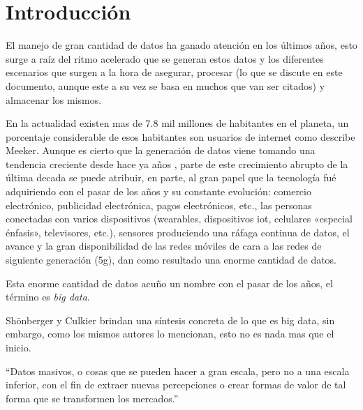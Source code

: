\section{Introducción} \label{sec:introduccion}
El manejo de gran cantidad de datos ha ganado atención en los últimos
años\cite{newvantage2019},
esto surge a raíz del ritmo acelerado que se generan estos datos y los 
diferentes escenarios que surgen a la hora de asegurar\cites{rawat2019,
kantarcioglu2019}, procesar (lo que se discute en este documento, aunque este a
su vez se basa en muchos que van ser citados) y almacenar\cites{padgavankar2014, agrawal2016, hongming2017}
los mismos.


En la actualidad existen mas de 7.8 mil millones de habitantes en el planeta\cite{world2021}, 
un porcentaje considerable de esos habitantes son usuarios de internet como
describe Meeker\cite{meeker2019}. Aunque es cierto que la generación de datos viene 
tomando una tendencia creciente desde hace ya años \cite{lyman2003},
parte de este crecimiento abrupto de la última decada se puede atribuir, en parte,
al gran papel que la tecnología
fué adquiriendo con el pasar de los años y su constante evolución: comercio electrónico, publicidad
electrónica, pagos electrónicos, etc.\cite{meeker2019,pellicer2019},
las personas conectadas con varios dispositivos (\gls{wearables}, dispositivos \acrshort{iot},
celulares «especial énfasis», televisores, etc.), sensores produciendo una
ráfaga continua de datos, el avance y la gran disponibilidad de las 
redes móviles de cara a las redes de siguiente generación
(5g)\cite{sultan2018}, dan como resultado una enorme cantidad de datos.

Esta enorme cantidad de datos acuño un nombre con el pasar de los años, el
término es \textit{big data}.

Shönberger y Culkier\cite{shonberger2016} brindan una síntesis concreta de lo
que es big data, sin embargo, como los mismos autores lo mencionan,
esto no es nada mas que el inicio.

\begin{displayquote}
    ``Datos masivos, o cosas que se pueden hacer a gran
    escala, pero no a una escala inferior, con el fin de extraer nuevas
    percepciones o crear formas de valor de tal forma que se transformen los
    mercados.''
\end{displayquote}

